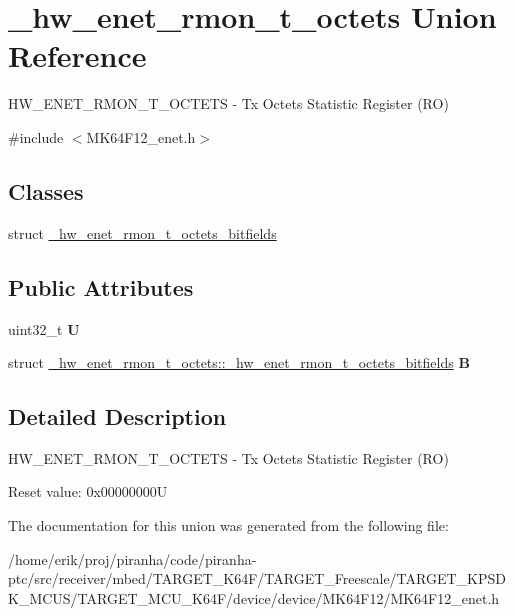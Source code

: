 \hypertarget{union__hw__enet__rmon__t__octets}{}\section{\+\_\+hw\+\_\+enet\+\_\+rmon\+\_\+t\+\_\+octets Union Reference}
\label{union__hw__enet__rmon__t__octets}


H\+W\+\_\+\+E\+N\+E\+T\+\_\+\+R\+M\+O\+N\+\_\+\+T\+\_\+\+O\+C\+T\+E\+TS -\/ Tx Octets Statistic Register (RO)  




{\ttfamily \#include $<$M\+K64\+F12\+\_\+enet.\+h$>$}

\subsection*{Classes}
\begin{DoxyCompactItemize}
\item 
struct \hyperlink{struct__hw__enet__rmon__t__octets_1_1__hw__enet__rmon__t__octets__bitfields}{\+\_\+hw\+\_\+enet\+\_\+rmon\+\_\+t\+\_\+octets\+\_\+bitfields}
\end{DoxyCompactItemize}
\subsection*{Public Attributes}
\begin{DoxyCompactItemize}
\item 
uint32\+\_\+t {\bfseries U}\hypertarget{union__hw__enet__rmon__t__octets_aa8109524bdc50a58e1c36ba7a6d8ff98}{}\label{union__hw__enet__rmon__t__octets_aa8109524bdc50a58e1c36ba7a6d8ff98}

\item 
struct \hyperlink{struct__hw__enet__rmon__t__octets_1_1__hw__enet__rmon__t__octets__bitfields}{\+\_\+hw\+\_\+enet\+\_\+rmon\+\_\+t\+\_\+octets\+::\+\_\+hw\+\_\+enet\+\_\+rmon\+\_\+t\+\_\+octets\+\_\+bitfields} {\bfseries B}\hypertarget{union__hw__enet__rmon__t__octets_af07a45ad0d7fa4336c5d148503333b10}{}\label{union__hw__enet__rmon__t__octets_af07a45ad0d7fa4336c5d148503333b10}

\end{DoxyCompactItemize}


\subsection{Detailed Description}
H\+W\+\_\+\+E\+N\+E\+T\+\_\+\+R\+M\+O\+N\+\_\+\+T\+\_\+\+O\+C\+T\+E\+TS -\/ Tx Octets Statistic Register (RO) 

Reset value\+: 0x00000000U 

The documentation for this union was generated from the following file\+:\begin{DoxyCompactItemize}
\item 
/home/erik/proj/piranha/code/piranha-\/ptc/src/receiver/mbed/\+T\+A\+R\+G\+E\+T\+\_\+\+K64\+F/\+T\+A\+R\+G\+E\+T\+\_\+\+Freescale/\+T\+A\+R\+G\+E\+T\+\_\+\+K\+P\+S\+D\+K\+\_\+\+M\+C\+U\+S/\+T\+A\+R\+G\+E\+T\+\_\+\+M\+C\+U\+\_\+\+K64\+F/device/device/\+M\+K64\+F12/M\+K64\+F12\+\_\+enet.\+h\end{DoxyCompactItemize}
